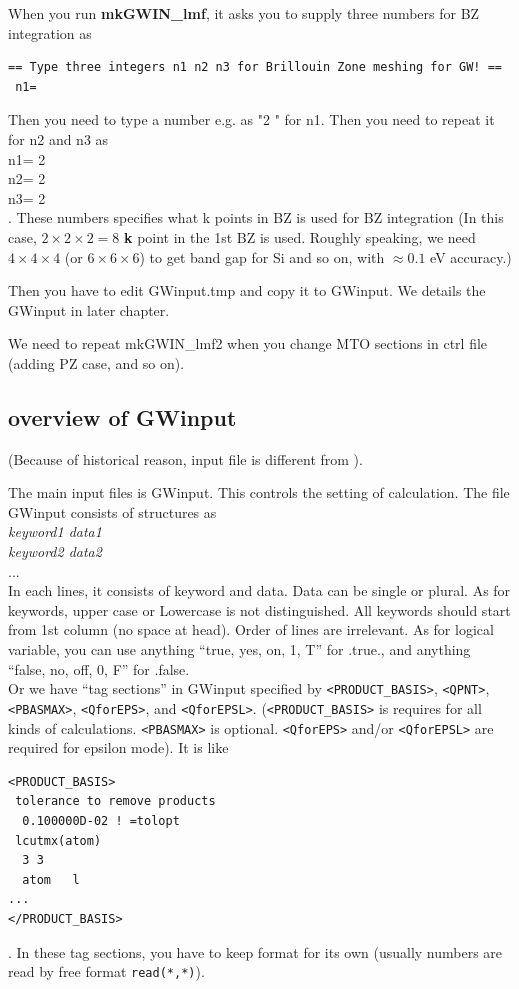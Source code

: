 {\vspace{3mm}
When you run {\bf mkGWIN\_lmf}, 
it asks you to supply three numbers for BZ integration as
{\baselineskip=3mm
\begin{verbatim}
== Type three integers n1 n2 n3 for Brillouin Zone meshing for GW! ==
 n1= 
\end{verbatim}
}
Then you need to type a number e.g. as "2 " for n1.
Then you need to repeat it for n2 and n3 as\\
 n1= 2 \\
 n2= 2 \\
 n3= 2 \\
. 
These numbers specifies what k points in BZ is used for BZ integration 
(In this case, $2\times 2\times 2=8$ {\bf k} point in the 1st BZ is used.
Roughly speaking, we need $4\times 4\times 4$ (or $6\times 6\times 6$) to get
band gap for Si and so on, with $\approx 0.1$ eV accuracy.)

Then you have to edit {\sf GWinput.tmp} and copy it to
{\sf GWinput}. We details the {\sf GWinput} in later chapter.

We need to repeat mkGWIN\_lmf2
when you change MTO sections in ctrl file (adding PZ case, and so on).


\subsection{overview of GWinput}
(Because of historical reason, input file is different from ).

The main input files is {\sf GWinput}.
This controls the setting of \GW calculation.
The file {\sf GWinput} consists of
structures as\\
{\it keyword1 data1}\\
{\it keyword2 data2}\\
...\\
In each lines, it consists of keyword and data. 
Data can be single or plural.
As for keywords, upper case or Lowercase is not distinguished.
All keywords should start from 1st column (no space at head).
Order of lines are irrelevant.
As for logical variable, you can use 
anything ``true, yes, on, 1, T'' for .true.,
and anything ``false, no, off, 0, F'' for .false.\\

Or we have ``tag sections'' in {\sf GWinput} 
specified by \verb#<PRODUCT_BASIS>#, 
\verb#<QPNT>#,  \verb#<PBASMAX>#, \verb#<QforEPS>#, and \verb#<QforEPSL>#.
(\verb#<PRODUCT_BASIS># is requires for all kinds of calculations.
\verb#<PBASMAX># is optional. \verb#<QforEPS># and/or \verb#<QforEPSL># are required
for epsilon mode). It is like
\begin{verbatim}
<PRODUCT_BASIS>
 tolerance to remove products
  0.100000D-02 ! =tolopt
 lcutmx(atom) 
  3 3 
  atom   l
...
</PRODUCT_BASIS>
\end{verbatim}
. In these tag sections, you have to keep format for its own
(usually numbers are read by free format \verb#read(*,*)#).

}
